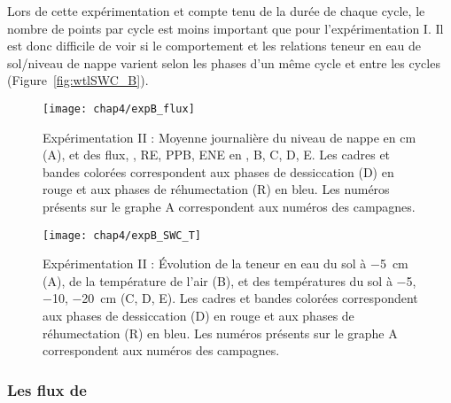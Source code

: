Lors de cette expérimentation et compte tenu de la durée de chaque cycle, le nombre de points par cycle est moins important que pour l'expérimentation I.
Il est donc difficile de voir si le comportement et les relations teneur en eau de sol/niveau de nappe varient selon les phases d'un même cycle et entre les cycles (Figure~\ref{fig:wtlSWC_B}).



\begin{figure}
\centering
\texttt{[image: chap4/expB\_flux]}
\caption{Expérimentation II : Moyenne journalière du niveau de nappe en cm (A), et des flux, \chh, RE, PPB, ENE en \si{\uml}, B, C, D, E. Les cadres et bandes colorées correspondent aux phases de dessiccation (D) en rouge et aux phases de réhumectation (R) en bleu. Les numéros présents sur le graphe A correspondent aux numéros des campagnes.}
\label{fig:HMty}
\end{figure}

\begin{figure}
\centering
\texttt{[image: chap4/expB\_SWC\_T]}
\caption{Expérimentation II : Évolution de la teneur en eau du sol à \SI{-5}{\centi\metre} (A), de la température de l'air (B), et des températures du sol à \num{-5}, \num{-10}, \SI{-20}{\centi\metre} (C, D, E). Les cadres et bandes colorées correspondent aux phases de dessiccation (D) en rouge et aux phases de réhumectation (R) en bleu. Les numéros présents sur le graphe A correspondent aux numéros des campagnes.}
\label{fig:HMty_T}
\end{figure}


\subsubsection{Les flux de \chh}

